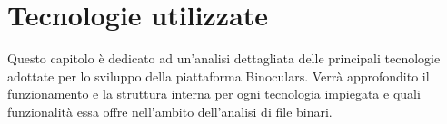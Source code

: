 \documentclass[../main.tex]{subfiles}
\begin{document}
\chapter{Tecnologie utilizzate}
\label{chap:conclusion}
Questo capitolo è dedicato ad un'analisi dettagliata delle principali tecnologie adottate per lo sviluppo della piattaforma Binoculars.
Verrà approfondito il funzionamento e la struttura interna per ogni tecnologia impiegata e quali funzionalità essa offre nell'ambito dell'analisi di
file binari.
\end{document}
